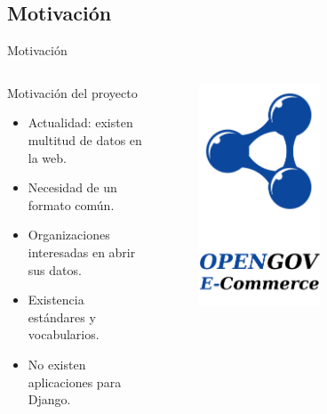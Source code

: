 \documentclass[spanish,xcolor=table,svgnames]{beamer}
\begin{document}
\subsection*{Motivación}
\begin{frame}{Motivación}
  \begin{columns}[onlytextwidth]
    \begin{column}{0.5\textwidth}
      \begin{block}{Motivación del proyecto}
        \begin{itemize}
          \item Actualidad: existen multitud de datos en la web.
          \item Necesidad de un formato común.
          \item Organizaciones interesadas en abrir sus datos.
          \item Existencia estándares y vocabularios.
          \item No existen aplicaciones para Django.
        \end{itemize}
      \end{block}
    \end{column}
    \begin{column}{0.5\textwidth}
      \centering
      \begin{figure}[H]
        \begin{center}
            \includegraphics[width=0.6\textwidth]{img/rdf.png}
        \end{center}
        \label{fig:python}
      \end{figure}
    \end{column}
​  \end{columns}
\end{frame}
\end{document}
